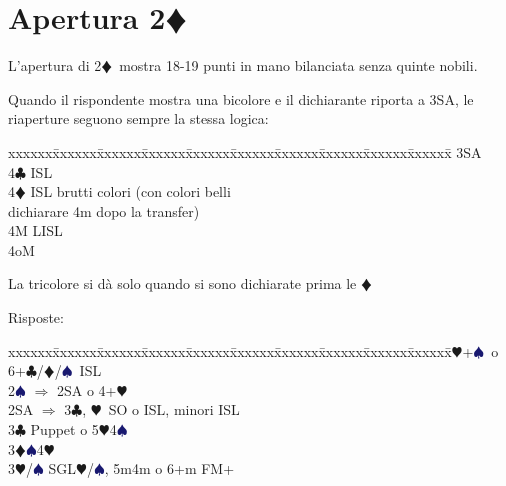 \documentclass[a4paper,italian]{article}
\newcommand{\BC}{\textcolor{OliveGreen}{$\clubsuit$}}
\newcommand{\BD}{\textcolor{RedOrange}{$\vardiamondsuit$}}
\newcommand{\BH}{\textcolor{Red2}{$\varheartsuit${}}}
\newcommand{\BS}{\textcolor{MidnightBlue}{$\spadesuit${}}}
\newcommand{\pdfd}{\texorpdfstring{\BD{}}{D}}
\newenvironment{bidtable}
{\begin{tabbing}

    xxxxxx\=xxxxxx\=xxxxxx\=xxxxxx\=xxxxxx\=xxxxxx\=xxxxxx\=xxxxxx\=xxxxxx\=xxxxxx\=\kill}
{\end{tabbing} }%
\newenvironment{sviluppi}
{\begin{tcolorbox}[colframe=azzurro,title=Sviluppi particolari]}
    {
\end{tcolorbox} }%
\begin{document}
                                    \section{Apertura 2\pdfd}
                                    \begin{multicols}{2}
                                        L'apertura di 2\BD\ mostra 18-19 punti in mano bilanciata senza quinte nobili.

                                        \begin{sviluppi}
                                            Quando il rispondente mostra una bicolore e il dichiarante riporta a 3SA, le riaperture seguono sempre la stessa logica:

                                            \begin{bidtable}\label{Riapertura3SA}
                                                3SA\+\\
                                                4\BC {} ISL\\
                                                4\BD {} ISL brutti colori (con colori belli\+\\ dichiarare 4m dopo la transfer)\-\\
                                                4M  LISL\\
                                                4oM \\
                                            \end{bidtable}
                                            La tricolore si dà solo quando si sono dichiarate prima le \BD
                                        \end{sviluppi}
                                        Risposte:
                                        \begin{bidtable}
                                            2\BH {}+\BS\ o 6+\BC /\BD /\BS\ ISL\\
                                            2\BS \> $\Rightarrow$ 2SA o 4+\BH \\
                                            2SA \> $\Rightarrow$ 3\BC , \BH\ SO o ISL, minori ISL\\
                                            3\BC \> Puppet o 5\BH 4\BS \\
                                            3\BD {}\BS 4\BH \\
                                            3\BH/\BS \> SGL\BH /\BS , 5m4m o 6+m FM+\\

\end{bidtable}
\end{multicols}
\end{document}
